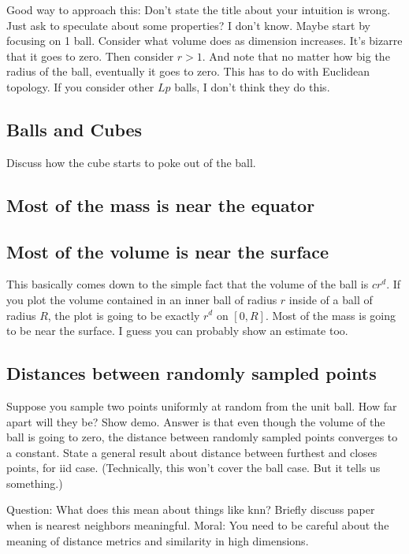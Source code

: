 \documentclass{book}
\begin{document}
Good way to approach this: Don't state the title about your intuition is wrong. Just ask to speculate about some properties? I don't know. Maybe start by focusing on 1 ball. Consider what volume does as dimension increases. It's bizarre that it goes to zero. Then consider $r>1$. And note that no matter how big the radius of the ball, eventually it goes to zero. This has to do with Euclidean topology. If you consider other $Lp$ balls, I don't think they do this. 



\subsection{Balls and Cubes}
Discuss how the cube starts to poke out of the ball. 

\subsection{Most of the mass is near the equator}

\subsection{Most of the volume is near the surface}
This basically comes down to the simple fact that the volume of the ball is $cr^d$. If you plot the volume contained in an inner ball of radius $r$ inside of a ball of radius $R$, the plot is going to be exactly $r^d$ on $[0, R]$. Most of the mass is going to be near the surface. I guess you can probably show an estimate too. 

\subsection{Distances between randomly sampled points}
Suppose you sample two points uniformly at random from the unit ball. How far apart will they be? Show demo. Answer is that even though the volume of the ball is going to zero, the distance between randomly sampled points converges to a constant. State a general result about distance between furthest and closes points, for iid case. (Technically, this won't cover the ball case. But it tells us something.) 

Question: What does this mean about things like knn? Briefly discuss paper when is nearest neighbors meaningful. Moral: You need to be careful about the meaning of distance metrics and similarity in high dimensions. 
\end{document}
